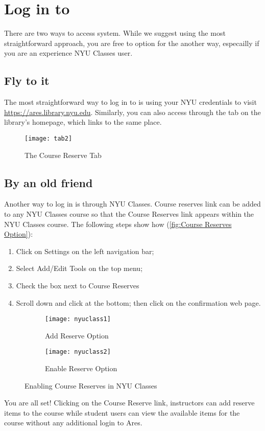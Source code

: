 \chapter{Log in to \ares}
\label{ch:login}
There are two ways to access \ares system. While we suggest using the most straightforward approach, you are free to option for the another way, especailly if you are an experience NYU Classes user. 
\section{Fly to it}
\label{sec:diret way}
The most straightforward way to log in to \ares is using your NYU credentials to visit \url{https://ares.library.nyu.edu}. Similarly, you can also access \ares through the \button{\crtab} tab on the library's homepage, which links to the same place.

\vspace*{3ex}
\begin{figure}[h]
    \centering
    \texttt{[image: tab2]}
    \caption{\footnotesize The Course Reserve Tab}
    \label{fig:Course Reserve Tab}
\end{figure}
\vspace*{2ex}


\section{By an old friend}
\label{sec:nyu classes}
Another way to log in is through NYU Classes. Course reserves link can be added to any NYU Classes course so that the Course Reserves link appears within the NYU Classes course. The following steps show how (\autoref{fig:Course Reserves Option}):
\begin{enumerate}
    \item Click on {\imp Settings} on the left navigation bar; 
    \item Select {\imp Add/Edit Tools} on the top menu; 
    \item Check the box \checkbox{\checkmark} next to {\imp Course Reserves}
    \item Scroll down and click  at the bottom; then click  on the confirmation web page.
\end{enumerate}

\begin{figure}[t]
    \begin{subfigure}{\textwidth}
        \texttt{[image: nyuclass1]}
        \caption{Add Reserve Option}
        \label{fig:Add Reserve Option}
    \end{subfigure}
    
    \begin{subfigure}{\textwidth}
        \texttt{[image: nyuclass2]}
        \caption{Enable Reserve Option}
        \label{fig:Enable Reserve Option}
        \end{subfigure}
\caption{Enabling Course Reserves in NYU Classes}
\label{fig:Course Reserves Option}
\end{figure}

You are all set! Clicking on the Course Reserve link, instructors can add reserve items to the course while student users can view the available items for the course without any additional login to Ares.